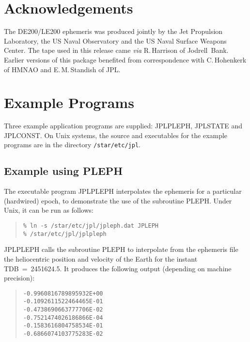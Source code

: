 \documentclass[twoside,11pt]{article}
\newcommand{\xlabel}[1]{}
\renewcommand{\_}{\texttt{\symbol{95}}}
\begin{document}
\section{\xlabel{acknowledgements}Acknowledgements}
\label{acknowledgements}

The DE200/LE200 ephemeris was produced jointly by the Jet Propulsion
Laboratory, the US Naval Observatory and the US Naval Surface Weapons
Center.  The tape used in this release came \textit{via}\/ R.\,Harrison
of Jodrell~Bank.  Earlier versions of this package benefited from
correspondence with C.\,Hohenkerk of HMNAO and E.\,M.\,Standish of JPL.

\newpage
\appendix

\section{\xlabel{example_programs}Example Programs}
\label{example_programs}

Three example application programs are supplied: JPLPLEPH, JPLSTATE and
JPLCONST.  On Unix systems, the source and executables for the example
programs are in the directory \texttt{/star/etc/jpl}.

\subsection{\xlabel{example_using_pleph}Example using PLEPH}
\label{example_using_pleph}

The executable program JPLPLEPH interpolates the ephemeris for a
particular (hardwired) epoch, to demonstrate the use of the subroutine
PLEPH. Under Unix, it can be run as follows:

\begin{quote}
\begin{verbatim}
% ln -s /star/etc/jpl/jpleph.dat JPLEPH
% /star/etc/jpl/jplpleph
\end{verbatim}
\end{quote}

JPLPLEPH calls the subroutine PLEPH to interpolate from the ephemeris
file the heliocentric position and velocity of the Earth for the instant
TDB~=~2451624.5.  It produces the following output (depending on machine
precision):

\begin{quote}
\begin{verbatim}
-0.9960816789895932E+00
-0.1092611522464465E-01
-0.4738690663777706E-02
-0.7521474026186866E-04
-0.1583616804758534E-01
-0.6866074103775283E-02
\end{verbatim}
\end{quote}
\end{document}
